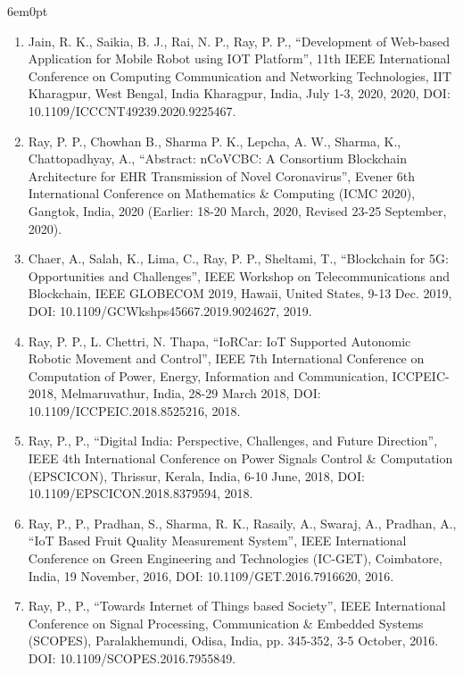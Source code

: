 \documentclass[11pt,a4paper]{moderncv}
\begin{document}
\begin{adjustwidth}{6em}{0pt}
\begin{enumerate}
	\item Jain, R. K., Saikia, B. J., Rai, N. P., Ray, P. P., “Development of Web-based Application for Mobile Robot using IOT Platform”, 11th IEEE International Conference on Computing Communication and Networking Technologies, IIT Kharagpur, West Bengal, India Kharagpur, India, July 1-3, 2020, 2020, DOI: 10.1109/ICCCNT49239.2020.9225467.
	
	\item Ray, P. P., Chowhan B., Sharma P. K., Lepcha, A. W., Sharma, K., Chattopadhyay, A., “Abstract: nCoVCBC: A Consortium Blockchain Architecture for EHR Transmission of Novel Coronavirus”, Evener 6th International Conference on Mathematics \& Computing (ICMC 2020), Gangtok, India, 2020 (Earlier: 18-20 March, 2020, Revised 23-25 September, 2020). 
	
	\item Chaer, A., Salah, K., Lima, C., Ray, P. P., Sheltami, T., “Blockchain for 5G: Opportunities and Challenges”, IEEE Workshop on Telecommunications and Blockchain, IEEE GLOBECOM 2019, Hawaii, United States, 9-13 Dec. 2019, DOI: 10.1109/GCWkshps45667.2019.9024627, 2019. 
	
	\item Ray, P. P., L. Chettri, N. Thapa, “IoRCar: IoT Supported Autonomic Robotic Movement and Control”, IEEE 7th International Conference on Computation of Power, Energy, Information and Communication, ICCPEIC-2018, Melmaruvathur, India, 28-29 March 2018, DOI: 10.1109/ICCPEIC.2018.8525216, 2018. 
	
	\item Ray, P., P., “Digital India: Perspective, Challenges, and Future Direction”, IEEE 4th International Conference on Power Signals Control \& Computation (EPSCICON), Thrissur, Kerala, India, 6-10 June, 2018, DOI: 10.1109/EPSCICON.2018.8379594, 2018.
	
	\item Ray, P., P., Pradhan, S., Sharma, R. K., Rasaily, A., Swaraj, A., Pradhan, A., “IoT Based Fruit Quality Measurement System”, IEEE International Conference on Green Engineering and Technologies (IC-GET), Coimbatore, India, 19 November, 2016, DOI: 10.1109/GET.2016.7916620, 2016.
	
	\item Ray, P., P., “Towards Internet of Things based Society”, IEEE International Conference on Signal Processing, Communication \& Embedded Systems (SCOPES), Paralakhemundi, Odisa, India, pp. 345-352, 3-5 October, 2016. DOI: 10.1109/SCOPES.2016.7955849.
	

\end{enumerate}
\end{adjustwidth}
\end{document}
